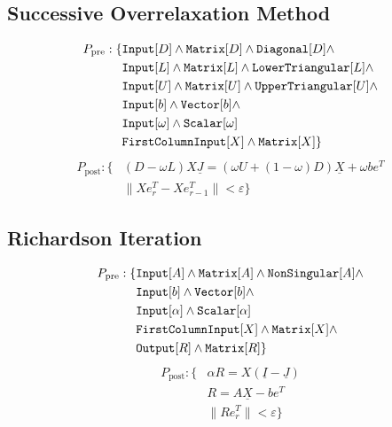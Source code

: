 \subsection{Successive Overrelaxation Method}
%
\begin{align*}
P_\text{pre}: \{ &\text{\ttfamily Input}[D] \land \text{\ttfamily Matrix}[D] \land \text{\ttfamily Diagonal}[D] \land \\
		&\text{\ttfamily Input}[L] \land \text{\ttfamily Matrix}[L] \land \text{\ttfamily LowerTriangular}[L] \land \\
		&\text{\ttfamily Input}[U] \land \text{\ttfamily Matrix}[U] \land \text{\ttfamily UpperTriangular}[U] \land \\
		&\text{\ttfamily Input}[b] \land \text{\ttfamily Vector}[b] \land \\
		&\text{\ttfamily Input}[\omega] \land \text{\ttfamily Scalar}[\omega] \\
		&\text{\ttfamily FirstColumnInput}[X] \land \text{\ttfamily Matrix}[X] \}
\end{align*}
%
\begin{align*}
P_\text{post}:	\{ &(D - \omega L) X \underline{J} = ( \omega U + (1 - \omega) D ) \underline{X} + \omega b e^T \\
			& \| X e_r^T - X e_{r-1}^T \| < \varepsilon\}
\end{align*}
%
%


\subsection{Richardson Iteration}
\begin{align*}
P_\text{pre}: \{ &\text{\ttfamily Input}[A] \land \text{\ttfamily Matrix}[A] \land \text{\ttfamily NonSingular}[A] \land \\
		&\text{\ttfamily Input}[b] \land \text{\ttfamily Vector}[b] \land \\
		&\text{\ttfamily Input}[\alpha] \land \text{\ttfamily Scalar}[\alpha] \\
		&\text{\ttfamily FirstColumnInput}[X] \land \text{\ttfamily Matrix}[X] \land \\
		&\text{\ttfamily Output}[R] \land \text{\ttfamily Matrix}[R] \}
\end{align*}
%
\begin{align*}
P_\text{post}:	\{ & \alpha R = X \left( \underline{I} - \underline{J} \right) \\
			& R = A \underline{X} - be^T \\
			& \| R e_r^T \| < \varepsilon \}
\end{align*}



